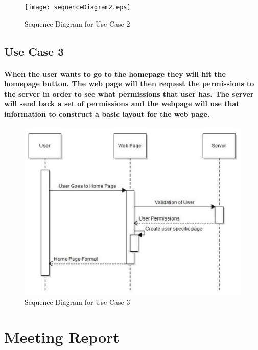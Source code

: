 \documentclass[12pt]{article}
\begin{document}
      \begin{figure}[H]
              \texttt{[image: sequenceDiagram2.eps]}
              \caption{Sequence Diagram for Use Case 2}
              \label{fig: Sequence Diagram 2}
      \end{figure}

  \newpage
  \subsection{\bf Use Case 3}

    \paragraph{\normalfont \indent When the user wants to go to the homepage they will hit the homepage button. The web page will then request the permissions to the server in order to see what permissions that user has. The server will send back a set of permissions and the webpage will use that information to construct a basic layout for the web page.
    }

      \begin{figure}[H]
              \includegraphics[width =\linewidth]{sequenceDiagram3.eps}
              \caption{Sequence Diagram for Use Case 3}
              \label{fig: Sequence Diagram 3}
      \end{figure}

\section{\bf Meeting Report}
\end{document}

